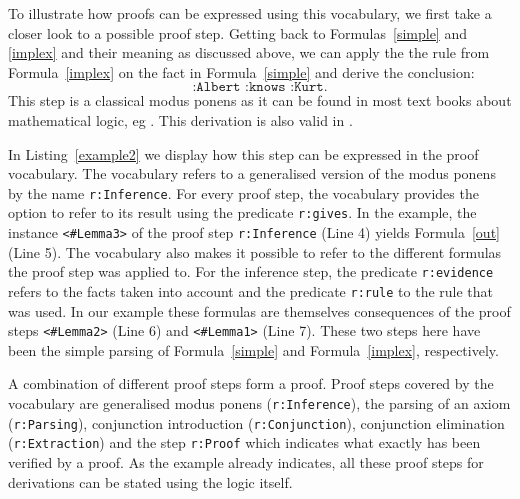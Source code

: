 To illustrate how proofs can be expressed using this vocabulary, we first take a closer look to a possible proof step. Getting back to Formulas~\ref{simple} and \ref{implex} and 
their meaning as discussed above, 
 we can apply the the rule from Formula~\ref{implex} on the fact in Formula~\ref{simple} and derive the conclusion:
\begin{equation}
\texttt{:Albert :knows :Kurt.}\label{out}
\end{equation}
This step is a classical modus ponens as it can be found in most text books about mathematical logic, eg \cite{enderton,mendelson,ebbinghaus}.
This derivation is also valid in \nthree. 

In Listing~\ref{example2} we display how this step can be expressed in the proof vocabulary. The vocabulary refers to a generalised version of the modus ponens by the 
name \texttt{r:Inference}. 
For every proof step, the vocabulary provides the option to refer to its result using the predicate \texttt{r:gives}.
In the example, the instance \texttt{<\#Lemma3>} of the proof  step \texttt{r:Inference} (Line 4) yields Formula~\ref{out} (Line 5). The vocabulary also makes it possible to 
refer to the different formulas the proof step was applied to. For the inference step, the predicate \texttt{r:evidence} refers to the facts taken into account and the 
predicate \texttt{r:rule} to the rule that was used. In our example these formulas are themselves consequences of the proof steps \texttt{<\#Lemma2>} (Line 6)
and \texttt{<\#Lemma1>} (Line 7). 
These two steps here have been the simple parsing of Formula~\ref{simple} and Formula~\ref{implex}, respectively. 

A combination of different  proof steps form a proof. Proof steps covered by the vocabulary are generalised modus ponens (\texttt{r:Inference}), the parsing of an axiom 
(\texttt{r:Parsing}), conjunction introduction (\texttt{r:Conjunction}), conjunction elimination (\texttt{r:Extraction}) and the step \texttt{r:Proof} which indicates what exactly 
has been verified by a proof. As the example already indicates, all these proof steps for \nthree derivations can be stated using the logic itself. 

